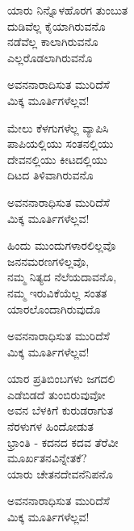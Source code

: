 \begin{myquote}
ಯಾರು ನಿನ್ನೊಳಹೊರಗ ತುಂಬುತ\\ದುಡಿವೆಲ್ಲ ಕೈಯಾಗಿರುವನೊ\\ನಡೆವೆಲ್ಲ ಕಾಲಾಗಿರುವನೊ\\ಎಲ್ಲರೊಡಲಾಗಿರುವನೊ
\end{myquote}

\begin{myquote}
ಅವನನಾರಾದಿಸುತ ಮುರಿದೆಸೆ\\ಮಿಕ್ಕ ಮೂರ್ತಿಗಳೆಲ್ಲವ!
\end{myquote}

\begin{myquote}
ಮೇಲು ಕೆಳಗುಗಳೆಲ್ಲ ವ್ಯಾಪಿಸಿ\\ಪಾಪಿಯಲ್ಲಿಯು ಸಂತನಲ್ಲಿಯು\\ದೇವನಲ್ಲಿಯು ಕೀಟದಲ್ಲಿಯು\\ದಿಟದ ತಿಳಿವಾಗಿರುವನೊ
\end{myquote}

\begin{myquote}
ಅವನನಾರಾಧಿಸುತ ಮುರಿದೆಸೆ\\ಮಿಕ್ಕ ಮೂರ್ತಿಗಳೆಲ್ಲವ!
\end{myquote}

\begin{myquote}
ಹಿಂದು ಮುಂದುಗಳಾರಲಿಲ್ಲವೊ\\ಜನನಮರಣಗಳಿಲ್ಲವೊ,\\ನಮ್ಮ ನಿತ್ಯದ ನೆಲೆಯದಾವನೊ,\\ನಮ್ಮ ಇರುವಿಕೆಯೆಲ್ಲ ಸಂತತ\\ಯಾರಲೊಂದಾಗಿರುವುದೊ
\end{myquote}

\begin{myquote}
ಅವನನಾರಾಧಿಸುತ ಮುರಿದೆಸೆ\\ಮಿಕ್ಕ ಮೂರ್ತಿಗಳೆಲ್ಲವ!
\end{myquote}

\begin{myquote}
ಯಾರ ಪ್ರತಿಬಿಂಬಗಳು ಜಗದಲಿ\\ಎಡೆಬಿಡದೆ ತುಂಬಿರುವುವೋ\\ಅವನ ಬೆಳಕಿಗೆ ಕುರುಡರಾಗುತ\\ನೆರಳುಗಳ ಹಿಂದೋಡುತ\\ಭ್ರಾಂತಿ - ಕದನದ ಕದವ ತೆರೆವೀ\\ಮೂರ್ಖತನವಿನ್ನೇತಕೆ?\\ಯಾರು ಚೇತನದೇವನೆನಿಪನೊ
\end{myquote}

\begin{myquote}
ಅವನನಾರಾಧಿಸುತ ಮುರಿದೆಸೆ\\ಮಿಕ್ಕ ಮೂರ್ತಿಗಳೆಲ್ಲವ!
\end{myquote}

